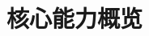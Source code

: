 \documentclass[aspectratio=169,xcolor=dvipsnames]{beamer}
\begin{document}
%
%
%
%
%
%

\section{核心能力概览}
\end{document}
